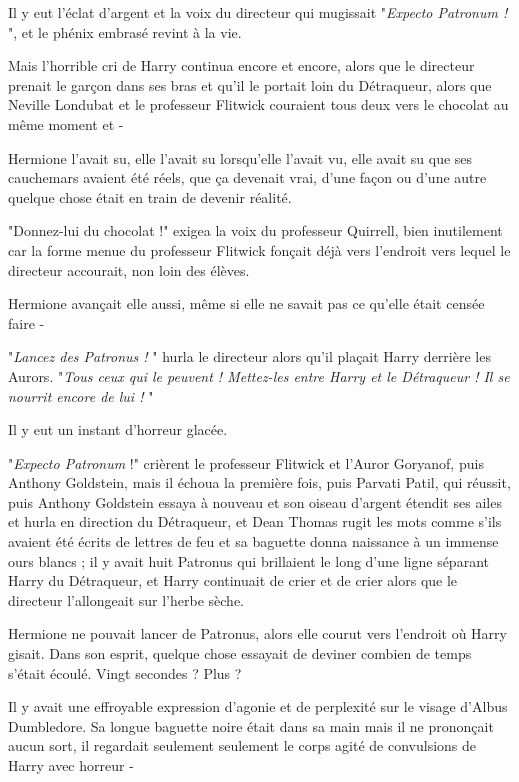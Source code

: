 Il y eut l'éclat d'argent et la voix du directeur qui mugissait "\emph{Expecto Patronum !} ", et le phénix embrasé revint à la vie.

Mais l'horrible cri de Harry continua encore et encore, alors que le directeur prenait le garçon dans ses bras et qu'il le portait loin du Détraqueur, alors que Neville Londubat et le professeur Flitwick couraient tous deux vers le chocolat au même moment et -

Hermione l'avait su, elle l'avait su lorsqu'elle l'avait vu, elle avait su que ses cauchemars avaient été réels, que ça devenait vrai, d'une façon ou d'une autre quelque chose était en train de devenir réalité.

"Donnez-lui du chocolat !" exigea la voix du professeur Quirrell, bien inutilement car la forme menue du professeur Flitwick fonçait déjà vers l'endroit vers lequel le directeur accourait, non loin des élèves.

Hermione avançait elle aussi, même si elle ne savait pas ce qu'elle était censée faire -

"\emph{Lancez des Patronus !} " hurla le directeur alors qu'il plaçait Harry derrière les Aurors. "\emph{Tous ceux qui le peuvent ! Mettez-les entre Harry et le Détraqueur ! Il se nourrit encore de lui !} "

Il y eut un instant d'horreur glacée.

"\emph{Expecto Patronum}  !" crièrent le professeur Flitwick et l'Auror Goryanof, puis Anthony Goldstein, mais il échoua la première fois, puis Parvati Patil, qui réussit, puis Anthony Goldstein essaya à nouveau et son oiseau d'argent étendit ses ailes et hurla en direction du Détraqueur, et Dean Thomas rugit les mots comme s'ils avaient été écrits de lettres de feu et sa baguette donna naissance à un immense ours blancs ; il y avait huit Patronus qui brillaient le long d'une ligne séparant Harry du Détraqueur, et Harry continuait de crier et de crier alors que le directeur l'allongeait sur l'herbe sèche.

Hermione ne pouvait lancer de Patronus, alors elle courut vers l'endroit où Harry gisait. Dans son esprit, quelque chose essayait de deviner combien de temps s'était écoulé. Vingt secondes ? Plus ?

Il y avait une effroyable expression d'agonie et de perplexité sur le visage d'Albus Dumbledore. Sa longue baguette noire était dans sa main mais il ne prononçait aucun sort, il regardait seulement seulement le corps agité de convulsions de Harry avec horreur -

